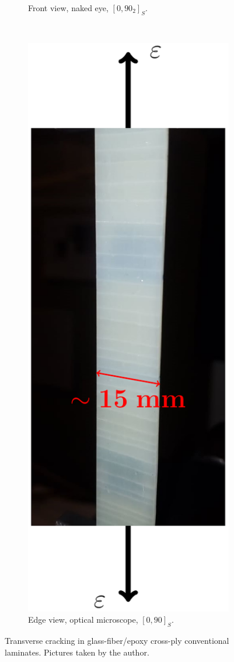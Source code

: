 \begin{figure}[!h]
\begin{subfigure}[b]{0.45\textwidth}
       \caption{Front view, naked eye, $\left[0,90_{2}\right]_{S}$.}
    \end{subfigure}
    ~
    \begin{subfigure}[b]{0.45\textwidth}
        \includegraphics[width=\textwidth]{pics/transversecracks-macro.pdf}
       \caption{Edge view, optical microscope, $\left[0,90\right]_{S}$.}
    \end{subfigure}

\caption{Transverse cracking in glass-fiber/epoxy cross-ply conventional laminates. Pictures taken by the author.}\label{intro:fig:transversecracks}
\end{figure}

